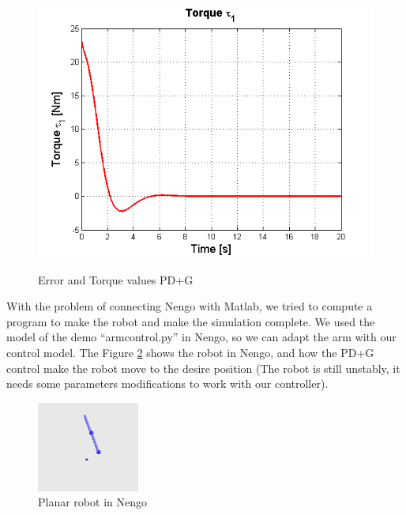 \begin{figure}[tb]
{   \includegraphics[scale =0.45] {imagenes/6-neuronal/T1g.png}
   \label{fig:T1g}
 }
\label{pdg}
\caption{Error and Torque values PD+G}
\end{figure}

With the problem of connecting Nengo with Matlab, we tried to compute a program to make the robot and make the simulation complete. We used the model of the demo ``armcontrol.py'' in Nengo, so we can adapt the arm with our control model. The Figure \ref{fig:pend} shows the robot in Nengo, and how the PD+G control make the robot move to the desire position (The robot is still unstably, it needs some parameters modifications to work with our controller).
\begin{figure}[h]
\centering
\includegraphics[width=0.3\textwidth]{imagenes/6-neuronal/pend.png}
 \caption{Planar robot in Nengo}
 \label{fig:pend}
\end{figure}
